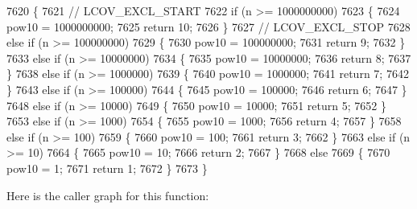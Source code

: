 \begin{DoxyCode}
7620 \{
7621     \textcolor{comment}{// LCOV\_EXCL\_START}
7622     \textcolor{keywordflow}{if} (n >= 1000000000)
7623     \{
7624         pow10 = 1000000000;
7625         \textcolor{keywordflow}{return} 10;
7626     \}
7627     \textcolor{comment}{// LCOV\_EXCL\_STOP}
7628     \textcolor{keywordflow}{else} \textcolor{keywordflow}{if} (n >= 100000000)
7629     \{
7630         pow10 = 100000000;
7631         \textcolor{keywordflow}{return}  9;
7632     \}
7633     \textcolor{keywordflow}{else} \textcolor{keywordflow}{if} (n >= 10000000)
7634     \{
7635         pow10 = 10000000;
7636         \textcolor{keywordflow}{return}  8;
7637     \}
7638     \textcolor{keywordflow}{else} \textcolor{keywordflow}{if} (n >= 1000000)
7639     \{
7640         pow10 = 1000000;
7641         \textcolor{keywordflow}{return}  7;
7642     \}
7643     \textcolor{keywordflow}{else} \textcolor{keywordflow}{if} (n >= 100000)
7644     \{
7645         pow10 = 100000;
7646         \textcolor{keywordflow}{return}  6;
7647     \}
7648     \textcolor{keywordflow}{else} \textcolor{keywordflow}{if} (n >= 10000)
7649     \{
7650         pow10 = 10000;
7651         \textcolor{keywordflow}{return}  5;
7652     \}
7653     \textcolor{keywordflow}{else} \textcolor{keywordflow}{if} (n >= 1000)
7654     \{
7655         pow10 = 1000;
7656         \textcolor{keywordflow}{return}  4;
7657     \}
7658     \textcolor{keywordflow}{else} \textcolor{keywordflow}{if} (n >= 100)
7659     \{
7660         pow10 = 100;
7661         \textcolor{keywordflow}{return}  3;
7662     \}
7663     \textcolor{keywordflow}{else} \textcolor{keywordflow}{if} (n >= 10)
7664     \{
7665         pow10 = 10;
7666         \textcolor{keywordflow}{return}  2;
7667     \}
7668     \textcolor{keywordflow}{else}
7669     \{
7670         pow10 = 1;
7671         \textcolor{keywordflow}{return} 1;
7672     \}
7673 \}
\end{DoxyCode}
Here is the caller graph for this function\+:
\mbox{\label{namespacenlohmann_1_1detail_1_1dtoa__impl_a12c1c5d8b46ba9702186445e73f86afe}} 
